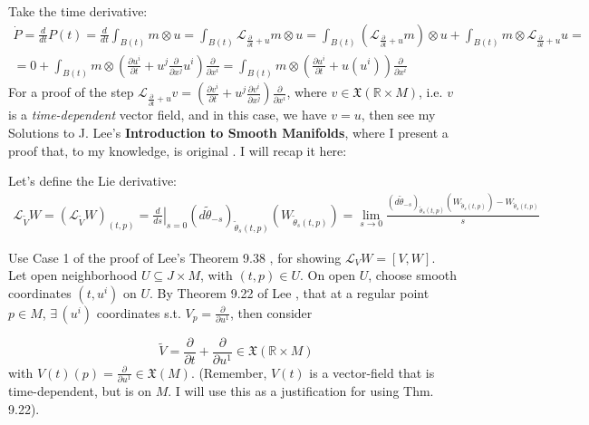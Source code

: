 \documentclass[twoside,landscape,10pt]{amsart}
\theoremstyle{plain}
\theoremstyle{definition}
\theoremstyle{remark}
\begin{document}
\begin{multicols*}{2}
Take the time derivative:
\[
\begin{gathered}
  \dot{P} = \frac{d}{dt}P(t)= \frac{d}{dt} \int_{B(t)} m\otimes u = \int_{B(t)} \mathcal{L}_{ \frac{ \partial }{ \partial t} +u } m\otimes u = \int_{B(t)} (\mathcal{L}_{\frac{ \partial }{ \partial t} + u } m ) \otimes u + \int_{B(t)} m \otimes \mathcal{L}_{\frac{ \partial }{ \partial t} + u } u = \\
  = 0 + \int_{B(t)} m \otimes \left( \frac{ \partial u^i}{ \partial t} + u^j \frac{ \partial }{ \partial x^j} u^i \right)\frac{ \partial }{ \partial x^i} = \int_{B(t)} m\otimes \left( \frac{ \partial u^i}{ \partial t} + u(u^i) \right) \frac{ \partial }{ \partial x^i}
\end{gathered}
\]
For a proof of the step $\mathcal{L}_{ \frac{ \partial }{ \partial t} +u } v = \left( \frac{ \partial v^i}{\partial t} + u^j \frac{ \partial v^i }{ \partial x^j} \right)\frac{\partial }{ \partial x^i}  $, where $v\in \mathfrak{X}(\mathbb{R}\times M)$, i.e. $v$ is a \emph{time-dependent} vector field, and in this case, we have $v=u$, then see my Solutions to J. Lee's \textbf{Introduction to Smooth Manifolds}, where I present a proof that, to my knowledge, is original \cite{EYeung2012}.  I will recap it here:

Let's define the Lie derivative:
\begin{equation}
\begin{gathered}
  \mathcal{L}_{\widetilde{V}}W = (\mathcal{L}_{\widetilde{V}}W)_{(t,p)} = \left. \frac{d}{ds} \right|_{s=0}(d\widetilde{\theta}_{-s})_{\widetilde{\theta}_s(t,p)}(W_{\widetilde{\theta}_s(t,p)})   = \lim_{s\to 0} \frac{ (d\widetilde{\theta}_{-s})_{\widetilde{\theta}_s(t,p)}( W_{\widetilde{\theta}_s(t,p)}) - W_{\widetilde{\theta}_s(t,p)} }{s}
\end{gathered}
\end{equation}


Use Case 1 of the proof of Lee's Theorem 9.38 \cite{JLee2012}, for showing $\mathcal{L}_VW = [V,W]$.  \\
Let open neighborhood $U \subseteq J \times M$, with $(t,p) \in U$.  On open $U$, choose smooth coordinates $(t,u^i)$ on $U$.  By Theorem 9.22 of Lee \cite{JLee2012}, that at a regular point $p\in M$, $\exists \, (u^i)$ coordinates s.t. $V_p = \frac{ \partial }{ \partial u^1}$, then consider 

\[
\widetilde{V} = \frac{ \partial }{ \partial t} + \frac{ \partial }{ \partial u^1} \in \mathfrak{X}(\mathbb{R} \times M)
\]
with $V(t)(p) = \frac{ \partial }{ \partial u^1} \in \mathfrak{X}(M)$.  (Remember, $V(t)$ is a vector-field that is time-dependent, but is on $M$.  I will use this as a justification for using Thm. 9.22).  


\end{multicols*}
\end{document}
